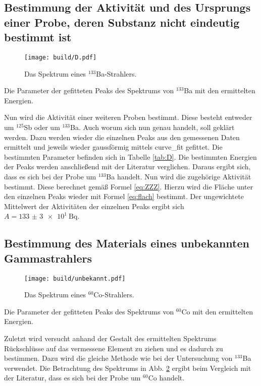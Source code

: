 \subsection{Bestimmung der Aktivität und des Ursprungs einer Probe, deren Substanz nicht eindeutig bestimmt ist}
\begin{figure}
	\centering
	\texttt{[image: build/D.pdf]}
	\caption{Das Spektrum eines $^{133}$Ba-Strahlers.}
	\label{fig:3}
\end{figure}
\begin{table}
	\centering
	\caption{Die Parameter der gefitteten Peaks des Spektrums von $^{133}$Ba mit den ermittelten Energien.}
	
\end{table}
Nun wird die Aktivität einer weiteren Proben bestimmt. Diese besteht entweder um $^{125}$Sb oder um $^{133}$Ba. Auch worum sich nun genau handelt, soll geklärt werden. Dazu werden wieder die einzelnen Peaks aus den gemessenen Daten ermittelt und jeweils wieder gaussförmig mittels curve\_fit \cite{scipy} gefittet. Die bestimmten Parameter befinden sich in Tabelle \ref{tab:D}. Die bestimmten Energien der Peaks werden anschließend mit der Literatur\cite{V18} verglichen. Daraus ergibt sich, dass es sich bei der Probe um $^{133}$Ba handelt. Nun wird die zugehörige Aktivität bestimmt. Diese berechnet gemäß Formel \eqref{eq:ZZZ}. Hierzu wird die Fläche unter den einzelnen Peaks wieder mit Formel \eqref{eq:flach} bestimmt. Der ungewichtete Mittelwert der Aktivitäten der einzelnen Peaks ergibt sich $A = \SI{133(3)e1}{\becquerel}$.


\subsection{Bestimmung des Materials eines unbekannten Gammastrahlers}
\begin{figure}
	\centering
	\texttt{[image: build/unbekannt.pdf]}
	\caption{Das Spektrum eines $^{60}$Co-Strahlers.}
	\label{fig:4}
\end{figure}
\begin{table}
	\centering
	\caption{Die Parameter der gefitteten Peaks des Spektrums von $^{60}$Co mit den ermittelten Energien.}
	
\end{table}
Zuletzt wird versucht anhand der Gestalt des ermittelten Spektrums Rückschlüsse auf das vermessene Element zu ziehen und es dadurch zu bestimmen. Dazu wird die gleiche Methode wie bei der Untersuchung von $^{133}$Ba verwendet. Die Betrachtung des Spektrums in Abb. \ref{fig:4} ergibt beim Vergleich mit der Literatur\cite{Co60}, dass es sich bei der Probe um $^{60}$Co handelt.%